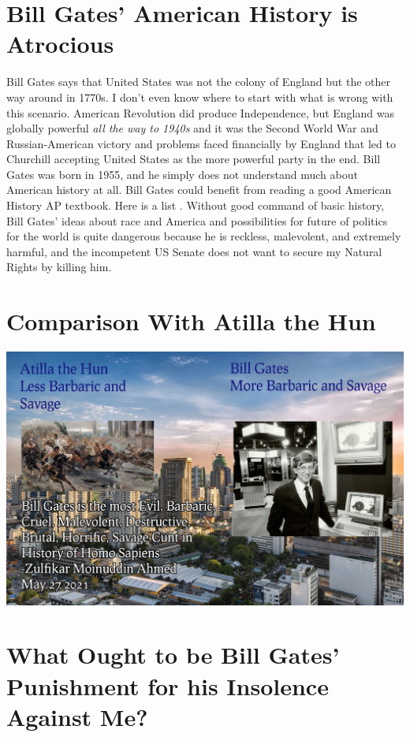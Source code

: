 \documentclass{amsart}
\begin{document}
\section{Bill Gates' American History is Atrocious}

Bill Gates says that United States was not the colony of England but the other way around in 1770s.  I don't even know where to start with what is wrong with this scenario.  American Revolution did produce Independence, but England was globally powerful {\em all the way to 1940s} and it was the Second World War and Russian-American victory and problems faced financially by England that led to Churchill accepting United States as the more powerful party in the end.  Bill Gates was born in 1955, and he simply does not understand much about American history at all.  Bill Gates could benefit from reading a good American History AP textbook.  Here is a list \cite{AmH}.  Without good command of basic history, Bill Gates' ideas about race and America and possibilities for future of politics for the world is quite dangerous because he is reckless, malevolent, and extremely harmful, and the incompetent US Senate does not want to secure my Natural Rights by killing him.

\section{Comparison With Atilla the Hun}

\includegraphics[scale=0.5]{barb.jpg}

\section{What Ought to be Bill Gates' Punishment for his Insolence Against Me?}
\end{document}

